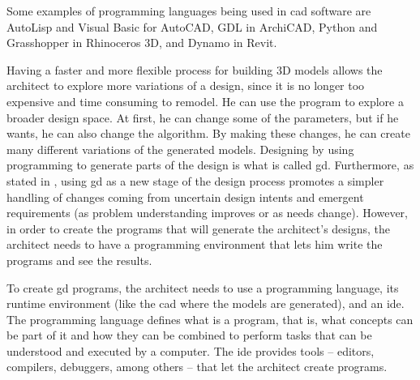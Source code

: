 Some examples of programming languages being used in \gls{cad} software are AutoLisp and Visual Basic for AutoCAD, GDL in ArchiCAD, Python and Grasshopper in Rhinoceros 3D, and Dynamo in Revit.


Having a faster and more flexible process for building 3D models allows the architect to explore more variations of a design, since it is no longer too expensive and time consuming to remodel.
He can use the program to explore a broader design space.
At first, he can change some of the parameters, but if he wants, he can also change the algorithm.
By making these changes, he can create many different variations of the generated models.
Designing by using programming to generate parts of the design is what is called \gls{gd}.
Furthermore, as stated in \cite{leitao2014pushing}, using \gls{gd} as a new stage of the design process promotes a simpler handling of changes coming from uncertain design intents and emergent requirements (as problem understanding improves or as needs change).
However, in order to create the programs that will generate the architect's designs, the architect needs to have a programming environment that lets him write the programs and see the results.


To create \gls{gd} programs, the architect needs to use a programming language, its runtime environment (like the \gls{cad} where the models are generated), and an \gls{ide}.
The programming language defines what is a program, that is, what concepts can be part of it and how they can be combined to perform tasks that can be understood and executed by a computer.
The \gls{ide} provides tools -- editors, compilers, debuggers, among others -- that let the architect create programs.


